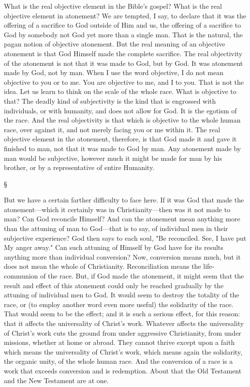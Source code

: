 \documentclass[12pt,a5paper,twoside,titlepage]{book}
\begin{document}
What is the real objective element in the 
Bible's gospel? What is the real objective 
element in atonement? We are tempted, I say, 
to declare that it was the offering of a sacrifice 
to God outside of Him and us, the offering of a 
sacrifice to God by somebody not God yet more 
than a single man. That is the natural, the 
pagan notion of objective atonement. But the 
real meaning of an objective atonement is that 
God Himself made the complete sacrifice. The 
real objectivity of the atonement is not that it 
was made to God, but by God. It was atonement 
made by God, not by man. When I use the 
word objective, I do not mean objective to you or 
to me. You are objective to me, and I to you. 
That is not the idea. Let us learn to think on 
the scale of the whole race. What is objective 
to that? The deadly kind of subjectivity is 
the kind that is engrossed with individuals, 
or with humanity, and does not allow for God. 
It is the egotism of the race. And the real objectivity 
is that which is objective to the whole 
human race, over against it, and not merely 
facing you or me within it. The real objective 
element in the atonement, therefore, is that God 
made it and gave it finished to man, not that 
it was made to God by man. Any atonement 
made by man would be subjective, however 
much it might be made for man by his brother, 
or by a representative of entire Humanity. 

\begin{center}
\S
\end{center}
  
But we have a certain farther difficulty to 
face here. If it was God that made the atonement---which 
it certainly was in Christianity---then 
was it not made to man? Can God reconcile 
Himself? And can the atonement mean 
anything more than the attuning of man to 
God---that is to say, of individual men in their 
subjective experience? God then says to each 
soul, "Be reconciled. See, I have put My anger 
away." Can such attuning of Himself by God 
have for its results anything more than individual 
conversion? Now, conversion means 
much, but it does not mean the whole of 
Christianity. Reconciliation means the life-communion 
of the race. But, if God made the 
atonement, it might seem that the result and 
effect of this atonement could only be reached 
gradually by the attuning of individual men to 
God. It would seem to destroy the totality of 
the race, or (to employ another word even 
more useful) the solidarity of the race. That 
would seem to be the effect; and it is such a 
serious effect, for this reason: that it affects 
the universality of Christ's work. Whatever 
affects the universality of Christ's work cuts 
the ground from under aggressive Christianity, 
from under missions, whether at home or 
abroad. They cannot thrive except upon a 
faith which means the universality of Christ's 
work, which means again the solidarity, the 
organic unity, of the whole human race. And 
the conversion of a race is a work that exceeds 
conversion and is redemption. About that the 
Old Testament and the New Testament are 
at one. 
\end{document}
